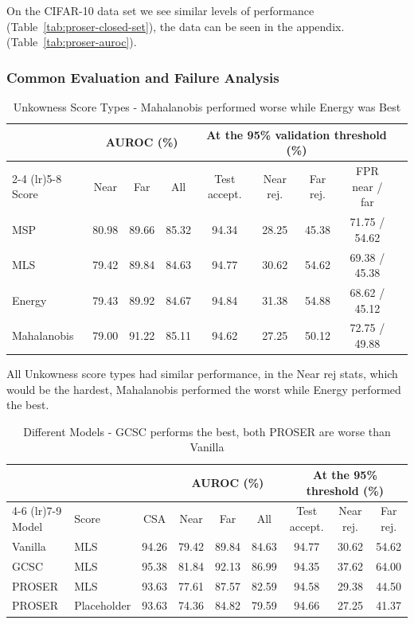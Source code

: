 \documentclass{article}
\begin{document}
On the CIFAR-10 data set we see similar levels of performance (Table~\ref{tab:proser-closed-set}), the data can be seen in the appendix. (Table~\ref{tab:proser-auroc}).


\subsubsection{Common Evaluation and Failure Analysis}

\begin{table}[tb]
  \caption{Unkowness Score Types - Mahalanobis performed worse while Energy was Best}
  \label{tab:osr-scores}
  \centering
  \footnotesize
  \begin{tabular}{lcccccccc}
    \toprule
    & \multicolumn{3}{c}{AUROC (\%)} & \multicolumn{4}{c}{At the 95\% validation threshold (\%)} \\
    \cmidrule(lr){2-4} \cmidrule(lr){5-8}
    Score & Near & Far & All & Test accept. & Near rej. & Far rej. & FPR near / far \\
    \midrule
    MSP         & 80.98 & 89.66 & 85.32 & 94.34 & 28.25 & 45.38 & 71.75 / 54.62 \\
    MLS         & 79.42 & 89.84 & 84.63 & 94.77 & 30.62 & 54.62 & 69.38 / 45.38 \\
    Energy      & 79.43 & 89.92 & 84.67 & 94.84 & 31.38 & 54.88 & 68.62 / 45.12 \\
    Mahalanobis & 79.00 & 91.22 & 85.11 & 94.62 & 27.25 & 50.12 & 72.75 / 49.88 \\
    \bottomrule
  \end{tabular}
\end{table}

All Unkowness score types had similar performance, in the Near rej stats, which would be the hardest, Mahalanobis performed the worst while Energy performed the best.

\begin{table}[tb]
  \caption{Different Models - GCSC performs the best, both PROSER are worse than Vanilla}
  \label{tab:osr-models}
  \centering
  \footnotesize
  \begin{tabular}{llccccccc}
    \toprule
    & & & \multicolumn{3}{c}{AUROC (\%)} & \multicolumn{3}{c}{At the 95\% threshold (\%)} \\
    \cmidrule(lr){4-6} \cmidrule(lr){7-9}
    Model & Score & CSA & Near & Far & All & Test accept. & Near rej. & Far rej. \\
    \midrule
    Vanilla & MLS         & 94.26 & 79.42 & 89.84 & 84.63 & 94.77 & 30.62 & 54.62 \\
    GCSC    & MLS         & 95.38 & 81.84 & 92.13 & 86.99 & 94.35 & 37.62 & 64.00 \\
    PROSER  & MLS         & 93.63 & 77.61 & 87.57 & 82.59 & 94.58 & 29.38 & 44.50 \\
    PROSER  & Placeholder & 93.63 & 74.36 & 84.82 & 79.59 & 94.66 & 27.25 & 41.37 \\
    \bottomrule
  \end{tabular}
\end{table}
\end{document}
